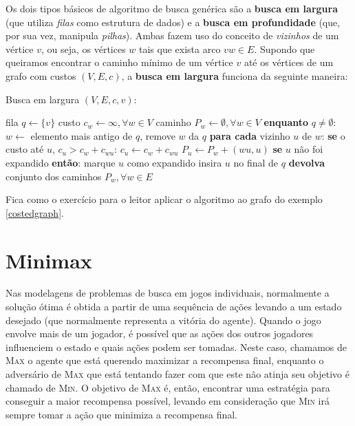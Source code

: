 Os dois tipos básicos de algoritmo de busca genérica são a \textbf{busca em largura} (que utiliza \textit{filas} como estrutura de dados) e a \textbf{busca em profundidade} (que, por sua vez, manipula \textit{pilhas}). Ambas fazem uso do conceito de \textit{vizinhos} de um vértice $v$, ou seja, os vértices $w$ tais que exista arco $vw \in E$. Supondo que queiramos encontrar o caminho mínimo de um vértice $v$ até os vértices de um grafo com custos $(V, E, c)$, a \textbf{busca em largura} funciona da seguinte maneira:

\begin{algorithm}
  \caption*{Busca em largura $(V, E, c, v)$:}
  \begin{algorithmic}
    \STATE fila $q \gets \{v\}$
    \STATE custo $c_w \gets \infty, \forall w \in V$
    \STATE caminho $P_w \gets \emptyset, \forall w \in V$
    \STATE \textbf{enquanto} $q \neq \emptyset$:
    \STATE \ind $w \gets $ elemento mais antigo de $q$, remove $w$ da $q$
    \STATE \ind \textbf{para cada} vizinho $u$ de $w$:
    \STATE \ind \ind \textbf{se } o custo até $u$, $c_u > c_w + c_{wu}$:
    \STATE \ind \ind \ind $c_u \gets c_w + c_{wu}$
    \STATE \ind \ind \ind $P_u \gets P_w + (wu, u)$
    \STATE \ind \ind \textbf{se} $u$ não foi expandido \textbf{ então}:
    \STATE \ind \ind \ind marque $u$ como expandido
    \STATE \ind \ind \ind insira $u$ no final de $q$
    \STATE \textbf{devolva} conjunto dos caminhos $P_w, \forall w \in E$
  \end{algorithmic}
\end{algorithm}

Fica como o exercício para o leitor aplicar o algoritmo ao grafo do exemplo \ref{costedgraph}.

\section{Minimax}
\label{sec:minimax}
Nas modelagens de problemas de busca em jogos individuais, normalmente a solução ótima é obtida a partir de uma sequência de ações levando a um estado desejado (que normalmente representa a vitória do agente). Quando o jogo envolve mais de um jogador, é possível que as ações dos outros jogadores influenciem o estado e quais ações podem ser tomadas. Neste caso, chamamos de \textsc{Max} o agente que está querendo maximizar a recompensa final, enquanto o adversário de \textsc{Max} que está tentando fazer com que este não atinja seu objetivo é chamado de \textsc{Min}. O objetivo de \textsc{Max} é, então, encontrar uma estratégia para conseguir a maior recompensa possível, levando em consideração que \textsc{Min} irá sempre tomar a ação que minimiza a recompensa final.

